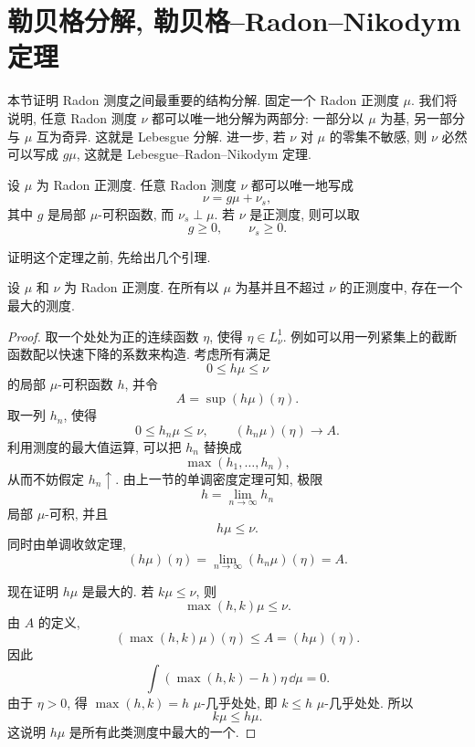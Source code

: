 \clearpage

\section{勒贝格分解, 勒贝格--Radon--Nikodym 定理}
\label{sec:lebesgue-radon-nikodym}

本节证明 Radon 测度之间最重要的结构分解. 固定一个 Radon 正测度 \(\mu\). 我们将说明, 任意 Radon 测度 \(\nu\) 都可以唯一地分解为两部分: 一部分以 \(\mu\) 为基, 另一部分与 \(\mu\) 互为奇异. 这就是 Lebesgue 分解. 进一步, 若 \(\nu\) 对 \(\mu\) 的零集不敏感, 则 \(\nu\) 必然可以写成 \(g\mu\), 这就是 Lebesgue--Radon--Nikodym 定理.

\begin{thm}[Lebesgue 分解]
	\label{thm:lebesgue-decomposition}
	设 \(\mu\) 为 Radon 正测度. 任意 Radon 测度 \(\nu\) 都可以唯一地写成
	\begin{equation}
		\nu=g\mu+\nu_s,
		\label{eq:lebesgue-decomposition}
	\end{equation}
	其中 \(g\) 是局部 \(\mu\)-可积函数, 而 \(\nu_s\perp\mu\). 若 \(\nu\) 是正测度, 则可以取
	\[
	g\geq0,\qquad \nu_s\geq0.
	\]
\end{thm}

证明这个定理之前, 先给出几个引理.

\begin{lem}\label{lem:max-mu-based-below-nu}
	设 \(\mu\) 和 \(\nu\) 为 Radon 正测度. 在所有以 \(\mu\) 为基并且不超过 \(\nu\) 的正测度中, 存在一个最大的测度.
\end{lem}

\begin{proof}
	取一个处处为正的连续函数 \(\eta\), 使得 \(\eta\in L^1_\nu\). 例如可以用一列紧集上的截断函数配以快速下降的系数来构造. 考虑所有满足
	\[
	0\leq h\mu\leq \nu
	\]
	的局部 \(\mu\)-可积函数 \(h\), 并令
	\[
	A=\sup (h\mu)(\eta).
	\]
	取一列 \(h_n\), 使得
	\[
	0\leq h_n\mu\leq\nu,
	\qquad
	(h_n\mu)(\eta)\to A.
	\]
	利用测度的最大值运算, 可以把 \(h_n\) 替换成
	\[
	\max(h_1,\ldots,h_n),
	\]
	从而不妨假定 \(h_n\uparrow\). 由上一节的单调密度定理可知, 极限
	\[
	h=\lim_{n\to\infty}h_n
	\]
	局部 \(\mu\)-可积, 并且
	\[
	h\mu\leq\nu.
	\]
	同时由单调收敛定理,
	\[
	(h\mu)(\eta)=\lim_{n\to\infty}(h_n\mu)(\eta)=A.
	\]
	
	现在证明 \(h\mu\) 是最大的. 若 \(k\mu\leq\nu\), 则
	\[
	\max(h,k)\mu\leq\nu.
	\]
	由 \(A\) 的定义,
	\[
	(\max(h,k)\mu)(\eta)\leq A=(h\mu)(\eta).
	\]
	因此
	\[
	\int (\max(h,k)-h)\eta\,\dd\mu=0.
	\]
	由于 \(\eta>0\), 得 \(\max(h,k)=h\) \(\mu\)-几乎处处, 即 \(k\leq h\) \(\mu\)-几乎处处. 所以
	\[
	k\mu\leq h\mu.
	\]
	这说明 \(h\mu\) 是所有此类测度中最大的一个.
\end{proof}

